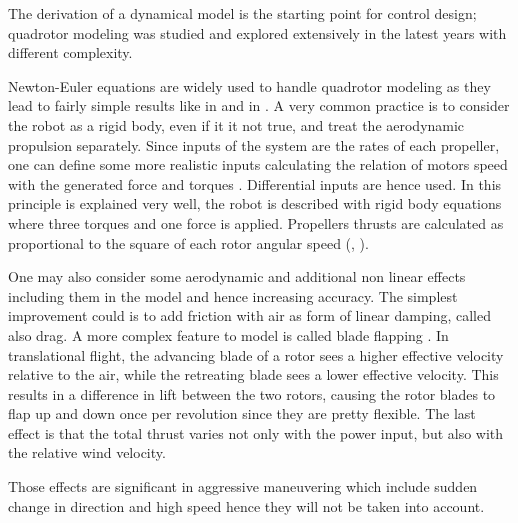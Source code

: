 The derivation of a dynamical model is the starting point for control design; quadrotor modeling was studied and explored extensively in the latest years with different complexity.\par Newton-Euler equations are widely used to handle quadrotor modeling as they lead to fairly simple results like in \cite{Michael2014}  and in \cite{Vendittelli}. A very common practice is to consider the robot as a rigid body, even if it it not true, and treat the aerodynamic propulsion separately. Since inputs of the system are the rates of each propeller, one can define some more realistic inputs calculating the relation of motors speed with the generated force and torques \cite{Luukkonen2011}. Differential inputs are hence used. In \cite{Mahony2012} this principle is explained very well, the robot is described with rigid body equations where three torques and one force is applied. Propellers thrusts are calculated as proportional to the square of each rotor angular speed (\cite{Bouabdallah2007}, \cite{Mahony2012}). \par One may also consider some aerodynamic and additional non linear effects including them in the model and hence increasing accuracy. The simplest improvement could is to add friction with air as form of linear damping, called also drag. A more complex feature to model is called blade flapping \cite{Mahony2012}. In translational flight, the advancing blade of a rotor sees a higher effective velocity relative to the air, while the retreating blade sees a lower effective velocity. This results in a difference in lift between the two rotors, causing the rotor blades to flap up and down once per revolution \cite{Hoffmann2007} since they are pretty flexible. The last effect is that the total thrust varies not only with the power input, but also with the relative wind velocity.  \par Those effects are significant in aggressive maneuvering which include sudden change in direction and high speed hence they will not be taken into account. \\

